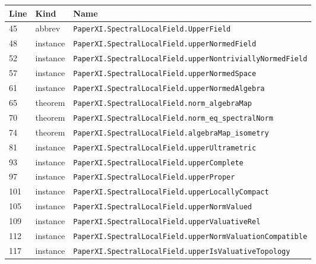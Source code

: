 \documentclass[10pt,oneside]{book}
\begin{document}
\begin{longtable}{@{}p{}p{}p{}@{}}\toprule Line&Kind&Name\\\midrule\endhead

45&abbrev&\nolinkurl{PaperXI.SpectralLocalField.UpperField}\\

48&instance&\nolinkurl{PaperXI.SpectralLocalField.upperNormedField}\\

52&instance&\nolinkurl{PaperXI.SpectralLocalField.upperNontriviallyNormedField}\\

57&instance&\nolinkurl{PaperXI.SpectralLocalField.upperNormedSpace}\\

61&instance&\nolinkurl{PaperXI.SpectralLocalField.upperNormedAlgebra}\\

65&theorem&\nolinkurl{PaperXI.SpectralLocalField.norm_algebraMap}\\

70&theorem&\nolinkurl{PaperXI.SpectralLocalField.norm_eq_spectralNorm}\\

74&theorem&\nolinkurl{PaperXI.SpectralLocalField.algebraMap_isometry}\\

81&instance&\nolinkurl{PaperXI.SpectralLocalField.upperUltrametric}\\

93&instance&\nolinkurl{PaperXI.SpectralLocalField.upperComplete}\\

97&instance&\nolinkurl{PaperXI.SpectralLocalField.upperProper}\\

101&instance&\nolinkurl{PaperXI.SpectralLocalField.upperLocallyCompact}\\

105&instance&\nolinkurl{PaperXI.SpectralLocalField.upperNormValued}\\

109&instance&\nolinkurl{PaperXI.SpectralLocalField.upperValuativeRel}\\

112&instance&\nolinkurl{PaperXI.SpectralLocalField.upperNormValuationCompatible}\\

117&instance&\nolinkurl{PaperXI.SpectralLocalField.upperIsValuativeTopology}\\


\end{longtable}
\end{document}
